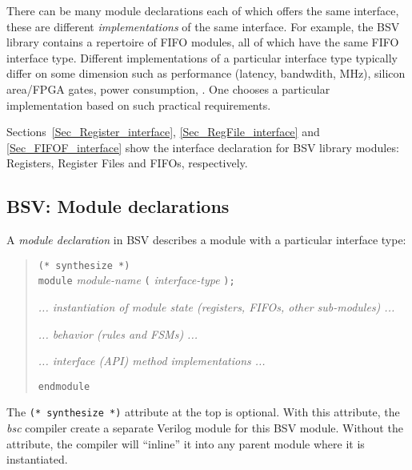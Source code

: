 There can be many module declarations each of which offers the same
interface, {\ie} these are different \emph{implementations} of the
same interface.  For example, the BSV library contains a repertoire of
FIFO modules, all of which have the same FIFO interface type.
Different implementations of a particular interface type typically
differ on some dimension such as performance (latency, bandwdith,
MHz), silicon area/FPGA gates, power consumption, {\etc}.  One chooses
a particular implementation based on such practical requirements.

Sections~\ref{Sec_Register_interface}, \ref{Sec_RegFile_interface} and
\ref{Sec_FIFOF_interface} show the interface declaration for BSV
library modules: Registers, Register Files and FIFOs, respectively.


\subsection{BSV: Module declarations}

\label{Sec_Module_Decls}


A \emph{module declaration} in BSV describes a module with a
particular interface type:

\begin{quote}
{\tt (* synthesize *)} \\
{\tt module} \emph{module-name} {\tt (} \emph{interface-type} {\tt );}

\hmm \emph{... instantiation of module state (registers, FIFOs, other sub-modules) ...}

\hmm \emph{... behavior (rules and FSMs) ...}

\hmm \emph{... interface (API) method implementations ...}

{\tt endmodule}
\end{quote}


The \verb|(* synthesize *)| attribute at the top is optional.  With
this attribute, the \emph{bsc} compiler create a separate Verilog
module for this BSV module.  Without the attribute, the compiler will
``inline'' it into any parent module where it is instantiated.

